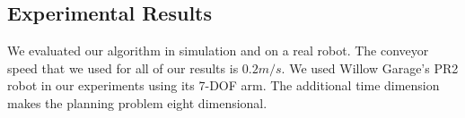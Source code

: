 \documentclass[a4paper,10pt]{article}
\begin{document}
\subsection{Experimental Results}
\label{sec:eval}

We evaluated our algorithm in simulation and on a real robot. The conveyor speed that we used for all of our results is $0.2m/s$. We used Willow Garage's PR2 robot in our experiments using its 7-DOF arm. The additional time dimension makes the planning problem eight dimensional.


\begin{table}[t]
\centering
{}
\label{tab:sim_results}
\end{table}
\end{document}
